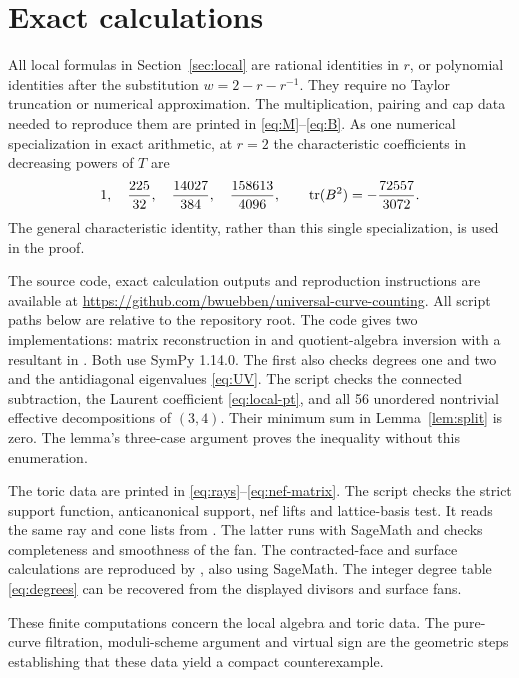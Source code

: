 \section{Exact calculations}

All local formulas in Section~\ref{sec:local} are rational identities
in $r$, or polynomial identities after the substitution
$w=2-r-r^{-1}$. They require no Taylor truncation or numerical
approximation. The multiplication, pairing and cap data needed to
reproduce them are printed in \eqref{eq:M}--\eqref{eq:B}.
As one numerical specialization in exact arithmetic, at $r=2$
the characteristic coefficients in decreasing powers of $T$ are
\[
 1,\quad\frac{225}{32},\quad\frac{14027}{384},\quad
 \frac{158613}{4096},\qquad
 \operatorname{tr}(B^2)=-\frac{72557}{3072}.
\]
The general characteristic identity, rather than this single
specialization, is used in the proof.

The source code, exact calculation outputs and reproduction instructions
are available at
\url{https://github.com/bwuebben/universal-curve-counting}.
All script paths below are relative to the repository root.
The code gives two implementations: matrix reconstruction
in  and quotient-algebra
inversion with a resultant in
. Both use SymPy 1.14.0.
The first also checks degrees one and two and the antidiagonal
eigenvalues \eqref{eq:UV}. The script
 checks the connected
subtraction, the Laurent coefficient \eqref{eq:local-pt}, and all
56 unordered nontrivial effective decompositions of $(3,4)$.
Their minimum sum in Lemma~\ref{lem:split} is zero. The lemma's
three-case argument proves the inequality without this enumeration.

The toric data are printed in \eqref{eq:rays}--\eqref{eq:nef-matrix}.
The script 
checks the strict support function, anticanonical support, nef lifts
and lattice-basis test. It reads the same ray and cone lists from
. The latter runs with SageMath and
checks completeness and smoothness of the fan. The contracted-face
and surface calculations are reproduced by
, also using SageMath.
The integer degree table \eqref{eq:degrees} can be recovered from
the displayed divisors and surface fans.

These finite computations concern the local algebra and toric data.
The pure-curve filtration, moduli-scheme argument and virtual sign
are the geometric steps establishing that these data yield a
compact counterexample.

